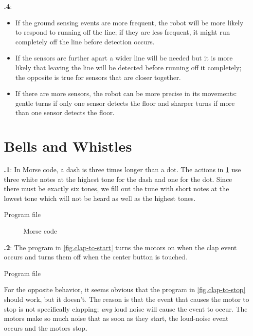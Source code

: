\documentclass[11pt,a4paper,english]{article}
\begin{document}
\textbf{\thesection.4}:
\begin{itemize}
\item If the ground sensing events are more frequent, the robot will be
more likely to respond to running off the line; if they are less
frequent, it might run completely off the line before detection occurs.
\item If the sensors are further apart a wider line will be needed but
it is more likely that leaving the line will be detected before running
off it completely; the opposite is true for sensors that are closer
together.
\item If there are more sensors, the robot can be more precise in its
movements: gentle turns if only one sensor detects the floor and sharper
turns if more than one sensor detects the floor.
\end{itemize}

\section{Bells and Whistles}

\textbf{\thesection.1}:
In Morse code, a dash is three times longer than a dot. The actions in
\cref{fig.morse} use three white notes at the highest tone for the
dash and one for the dot. Since there must be exactly six tones, we fill
out the tune with short notes at the lowest tone which will not be heard
as well as the highest tones.

{\raggedleft \hfill Program file }

\begin{figure}
\begin{center}
\caption{Morse code}\label{fig.morse}
\end{center}
\end{figure}


\textbf{\thesection.2}: The program in \cref{fig.clap-to-start} turns the motors on when
the clap event occurs and turns them off when the center button is
touched.

{\raggedleft \hfill Program file }

For the opposite behavior, it seems obvious that the program in
\cref{fig.clap-to-stop} should work, but it doesn't. The reason is
that the event that causes the motor to stop is not specifically
clapping; \emph{any} loud noise will cause the event to occur. The
motors make so much noise that as soon as they start, the loud-noise
event occurs and the motors stop.
\end{document}

